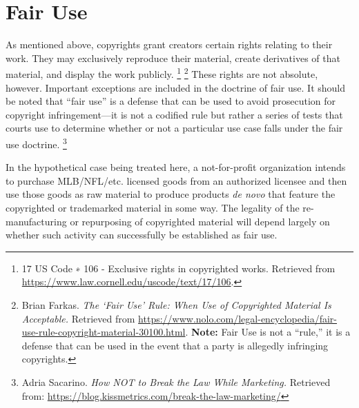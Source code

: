 \documentclass[letterpaper,11pt]{texMemo}
\begin{document}
\section*{Fair Use}
  As mentioned above, copyrights grant creators certain rights relating to their work. They may exclusively reproduce their material, create derivatives of that material, and display the work publicly.
    \footnote{17 US Code \textsection∗ 106 - Exclusive rights in copyrighted works. Retrieved from \href{https://www.law.cornell.edu/uscode/text/17/106}{https://www.law.cornell.edu/uscode/text/17/106}.
    }
    \footnote{Brian Farkas. \emph{The `Fair Use' Rule: When Use of Copyrighted Material Is Acceptable.} Retrieved from \href{https://www.nolo.com/legal-encyclopedia/fair-use-rule-copyright-material-30100.html}{https://www.nolo.com/legal-encyclopedia/fair-use-rule-copyright-material-30100.html}. \textbf{Note:} Fair Use is not a ``rule,'' it is a defense that can be used in the event that a party is allegedly infringing copyrights.
    }
  These rights are not absolute, however. Important exceptions are included in the doctrine of fair use. It should be noted that ``fair use'' is a defense that can be used to avoid prosecution for copyright infringement---it is not a codified rule but rather a series of tests that courts use to determine whether or not a particular use case falls under the fair use doctrine.
    \footnote{Adria Sacarino. \emph{How NOT to Break the Law While Marketing.} Retrieved from: \href{https://blog.kissmetrics.com/break-the-law-marketing/}{https://blog.kissmetrics.com/break-the-law-marketing/}
    }

  In the hypothetical case being treated here, a not-for-profit organization intends to purchase MLB/NFL/etc. licensed goods from an authorized licensee and then use those goods as raw material to produce products \emph{de novo} that feature the copyrighted or trademarked material in some way. The legality of the re-manufacturing or repurposing of copyrighted material will depend largely on whether such activity can successfully be established as fair use.
\end{document}
